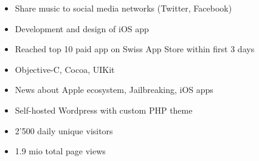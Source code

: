 \begin{itemize}
	\item Share music to social media networks (Twitter, Facebook)
	\item Development and design of iOS app
	\item Reached top 10 paid app on Swiss App Store within first 3 days
	\item Objective-C, Cocoa, UIKit
\end{itemize}

\divider

\begin{itemize}
	\item News about Apple ecosystem, Jailbreaking, iOS apps
	\item Self-hosted Wordpress with custom PHP theme
	\item 2'500 daily unique visitors
	\item 1.9 mio total page views
\end{itemize}